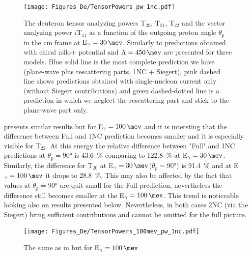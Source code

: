     \begin{figure}[h]
        \begin{center}
        \texttt{[image: Figures\_De/TensorPowers\_pw\_1nc.pdf]}
        \end{center}
        \caption{The deuteron tensor analyzing powers T$_{20}$, T$_{21}$, T$_{22}$ and 
        the vector analyzing power $i\text{T}_{11}$ as a function of the
        outgoing proton angle $\theta_p$ in the \gls{cm} frame at $\text{E}_\gamma = \SI{30}{\mev}$.
        Similarly to  predictions obtained with chiral \gls{n4lo+} potential
        and $\Lambda=\SI{450}{\mev}$ are presented for three models.
        Blue solid line is the most complete prediction we have (plane-wave plus rescattering parts, 1NC + Siegert), pink dashed line shows predictions obtained with
        single-nucleon current only (without Siegert contributions) and green dashed-dotted line
        is a prediction in which we neglect the rescattering part
        and stick to the plane-wave part only.}
        \label{tensor_pw_1nc}
    \end{figure}

     presents similar results but for E$_\gamma = \SI{100}{\mev}$
    and it is intersting that the difference between Full and 1NC prediction becomes smaller
    and it is especially visible for $\text{T}_{22}$. At this energy the relative difference 
    between "Full" and 1NC predictions
    at $\theta_p = \ang{90}$ is \SI{43.6}{\percent} comparing to \SI{122.8}{\percent}
    at E$_\gamma = \SI{30}{\mev}$. Similarly, the difference for T$_{20}$
    at E$_\gamma = \SI{30}{\mev}$($\theta_p = \ang{90}$) is \SI{91.4}{\percent}
    and at E$_\gamma = \SI{100}{\mev}$ it drops to \SI{28.8}{\percent}.
    This may also be affected by the fact that values at $\theta_p = \ang{90}$ 
    are quit small for the Full prediction, nevertheless the difference still becomes smaller at the
    E$_\gamma = \SI{100}{\mev}$.
    This trend is noticeable looking also on results presented below.
    Nevertheless, in both cases 2NC (via the Siegert) bring sufficient contributions
    and cannot be omitted for the full picture.

    \begin{figure}[h]
        \begin{center}
        \texttt{[image: Figures\_De/TensorPowers\_100mev\_pw\_1nc.pdf]}
        \end{center}
        \caption{The same as in  but for E$_\gamma=\SI{100}{\mev}$}
        \label{tensor_pw_1nc_100mev}
    \end{figure}

